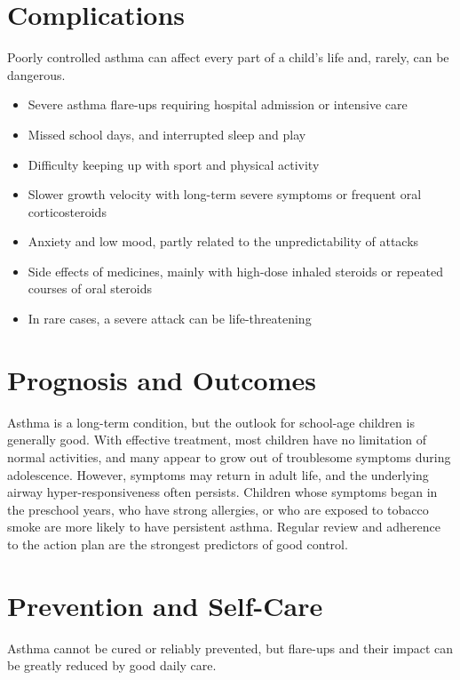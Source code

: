 \section*{Complications}
Poorly controlled asthma can affect every part of a child's life and, rarely, can be dangerous.

\begin{itemize}
    \item Severe asthma flare-ups requiring hospital admission or intensive care
    \item Missed school days, and interrupted sleep and play
    \item Difficulty keeping up with sport and physical activity
    \item Slower growth velocity with long-term severe symptoms or frequent oral corticosteroids
    \item Anxiety and low mood, partly related to the unpredictability of attacks
    \item Side effects of medicines, mainly with high-dose inhaled steroids or repeated courses of oral steroids
    \item In rare cases, a severe attack can be life-threatening
\end{itemize}

\section*{Prognosis and Outcomes}
Asthma is a long-term condition, but the outlook for school-age children is generally good. With effective treatment, most children have no limitation of normal activities, and many appear to grow out of troublesome symptoms during adolescence. However, symptoms may return in adult life, and the underlying airway hyper-responsiveness often persists. Children whose symptoms began in the preschool years, who have strong allergies, or who are exposed to tobacco smoke are more likely to have persistent asthma. Regular review and adherence to the action plan are the strongest predictors of good control.

\section*{Prevention and Self-Care}
Asthma cannot be cured or reliably prevented, but flare-ups and their impact can be greatly reduced by good daily care.

